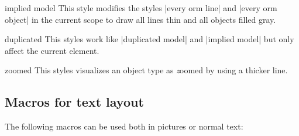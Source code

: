 \documentclass[a4paper,10pt]{article}
\begin{document}
\begin{stylekey}{implied model}
  This style modifies the styles |every orm line| and |every orm object| in the current scope to draw all lines thin and all objects filled gray.
\begin{figure}[h]
\centering
\begin{codeexample}[]
\end{codeexample}
\end{figure}
\end{stylekey}

\begin{stylekey}{duplicated}
This styles work like |duplicated model| and |implied model| but only affect the current element.
\begin{codeexample}[]
\end{codeexample}
\end{stylekey}


\begin{stylekey}{zoomed}
This styles visualizes an object type as {\emph zoomed} by using a thicker line.
\begin{codeexample}[]
\end{codeexample}
\end{stylekey}

\subsection{Macros for text layout} 
\label{sec:ormtext}
The following macros can be used both in \tikzname{} pictures or normal text:
\end{document}
